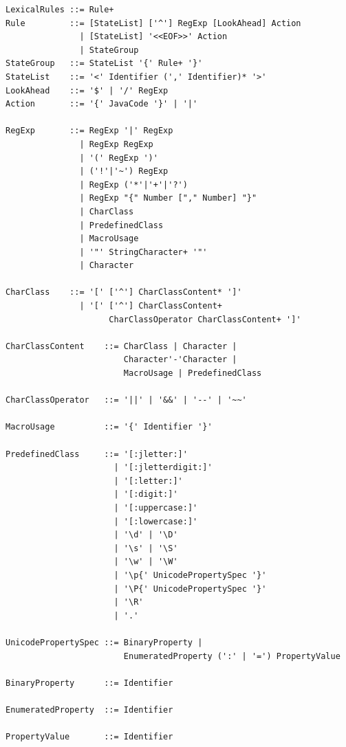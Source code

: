 \documentclass[11pt]{scrartcl}
\begin{document}
\begin{verbatim}
LexicalRules ::= Rule+ 
Rule         ::= [StateList] ['^'] RegExp [LookAhead] Action 
               | [StateList] '<<EOF>>' Action
               | StateGroup 
StateGroup   ::= StateList '{' Rule+ '}' 
StateList    ::= '<' Identifier (',' Identifier)* '>' 
LookAhead    ::= '$' | '/' RegExp
Action       ::= '{' JavaCode '}' | '|'

RegExp       ::= RegExp '|' RegExp 
               | RegExp RegExp 
               | '(' RegExp ')'
               | ('!'|'~') RegExp
               | RegExp ('*'|'+'|'?')
               | RegExp "{" Number ["," Number] "}" 
               | CharClass
               | PredefinedClass 
               | MacroUsage 
               | '"' StringCharacter+ '"' 
               | Character 

CharClass    ::= '[' ['^'] CharClassContent* ']'
               | '[' ['^'] CharClassContent+ 
                     CharClassOperator CharClassContent+ ']'
                 
CharClassContent    ::= CharClass | Character |
                        Character'-'Character | 
                        MacroUsage | PredefinedClass

CharClassOperator   ::= '||' | '&&' | '--' | '~~'

MacroUsage          ::= '{' Identifier '}'

PredefinedClass     ::= '[:jletter:]' 
                      | '[:jletterdigit:]' 
                      | '[:letter:]' 
                      | '[:digit:]'
                      | '[:uppercase:]' 
                      | '[:lowercase:]'
                      | '\d' | '\D'
                      | '\s' | '\S'
                      | '\w' | '\W'
                      | '\p{' UnicodePropertySpec '}'
                      | '\P{' UnicodePropertySpec '}'
                      | '\R'
                      | '.'          
                            
UnicodePropertySpec ::= BinaryProperty | 
                        EnumeratedProperty (':' | '=') PropertyValue

BinaryProperty      ::= Identifier

EnumeratedProperty  ::= Identifier

PropertyValue       ::= Identifier
\end{verbatim}
\end{document}

